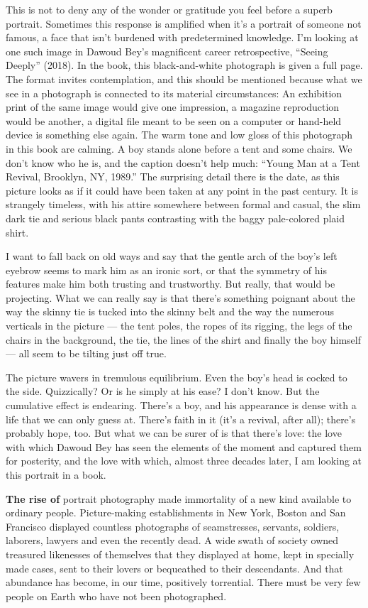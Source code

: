 This is not to deny any of the wonder or gratitude you feel before a
superb portrait. Sometimes this response is amplified when it's a
portrait of someone not famous, a face that isn't burdened with
predetermined knowledge. I'm looking at one such image in Dawoud Bey's
magnificent career retrospective, ``Seeing Deeply'' (2018). In the book,
this black-and-white photograph is given a full page. The format invites
contemplation, and this should be mentioned because what we see in a
photograph is connected to its material circumstances: An exhibition
print of the same image would give one impression, a magazine
reproduction would be another, a digital file meant to be seen on a
computer or hand-held device is something else again. The warm tone and
low gloss of this photograph in this book are calming. A boy stands
alone before a tent and some chairs. We don't know who he is, and the
caption doesn't help much: ``Young Man at a Tent Revival, Brooklyn, NY,
1989.'' The surprising detail there is the date, as this picture looks
as if it could have been taken at any point in the past century. It is
strangely timeless, with his attire somewhere between formal and casual,
the slim dark tie and serious black pants contrasting with the baggy
pale-colored plaid shirt.

I want to fall back on old ways and say that the gentle arch of the
boy's left eyebrow seems to mark him as an ironic sort, or that the
symmetry of his features make him both trusting and trustworthy. But
really, that would be projecting. What we can really say is that there's
something poignant about the way the skinny tie is tucked into the
skinny belt and the way the numerous verticals in the picture --- the
tent poles, the ropes of its rigging, the legs of the chairs in the
background, the tie, the lines of the shirt and finally the boy himself
--- all seem to be tilting just off true.

The picture wavers in tremulous equilibrium. Even the boy's head is
cocked to the side. Quizzically? Or is he simply at his ease? I don't
know. But the cumulative effect is endearing. There's a boy, and his
appearance is dense with a life that we can only guess at. There's faith
in it (it's a revival, after all); there's probably hope, too. But what
we can be surer of is that there's love: the love with which Dawoud Bey
has seen the elements of the moment and captured them for posterity, and
the love with which, almost three decades later, I am looking at this
portrait in a book.

\textbf{The rise of} portrait photography made immortality of a new kind
available to ordinary people. Picture-making establishments in New York,
Boston and San Francisco displayed countless photographs of
seamstresses, servants, soldiers, laborers, lawyers and even the
recently dead. A wide swath of society owned treasured likenesses of
themselves that they displayed at home, kept in specially made cases,
sent to their lovers or bequeathed to their descendants. And that
abundance has become, in our time, positively torrential. There must be
very few people on Earth who have not been photographed.

